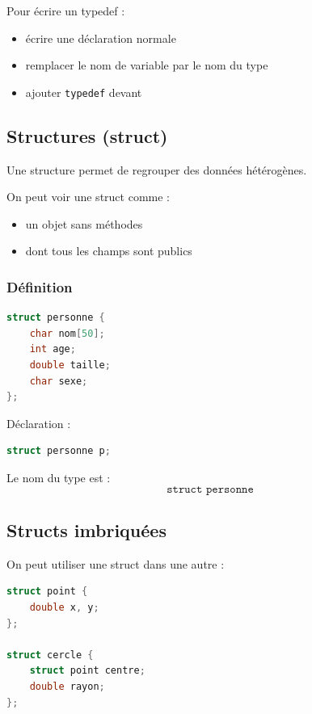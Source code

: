 Pour écrire un typedef :

\begin{itemize}
    \item écrire une déclaration normale
    \item remplacer le nom de variable par le nom du type
    \item ajouter \texttt{typedef} devant
\end{itemize}

\subsection{Structures (struct)}

Une structure permet de regrouper des données hétérogènes.

On peut voir une struct comme :

\begin{itemize}
    \item un objet sans méthodes
    \item dont tous les champs sont publics
\end{itemize}

\subsubsection{Définition}

\begin{lstlisting}[language=C]
struct personne {
    char nom[50];
    int age;
    double taille;
    char sexe;
};
\end{lstlisting}

Déclaration :

\begin{lstlisting}[language=C]
struct personne p;
\end{lstlisting}

Le nom du type est :
\[
\texttt{struct personne}
\]

\subsection{Structs imbriquées}

On peut utiliser une struct dans une autre :

\begin{lstlisting}[language=C]
struct point {
    double x, y;
};

struct cercle {
    struct point centre;
    double rayon;
};
\end{lstlisting}

